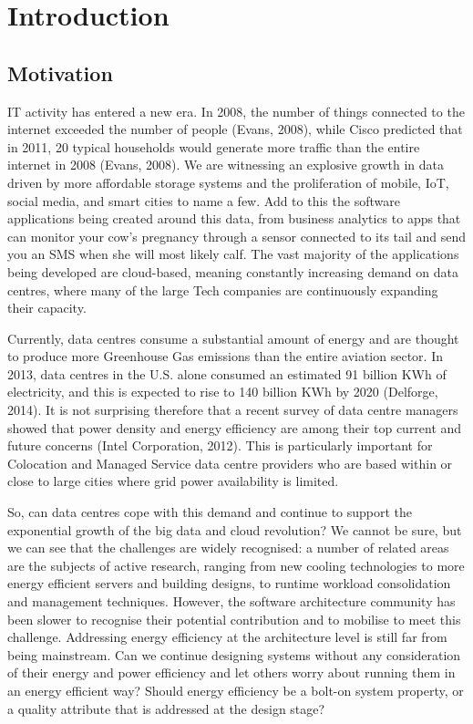 \chapter{Introduction}

\section{Motivation}

IT activity has entered a new era. In 2008, the number of things connected to the internet exceeded the number of people (Evans, 2008), while Cisco predicted that in 2011, 20 typical households would generate more traffic than the entire internet in 2008 (Evans, 2008). We are witnessing an explosive growth in data driven by more affordable storage systems and the proliferation of mobile, IoT, social media, and smart cities to name a few. Add to this the software applications being created around this data, from business analytics to apps that can monitor your cow’s pregnancy through a sensor connected to its tail and send you an SMS when she will most likely calf. The vast majority of the applications being developed are cloud-based, meaning constantly increasing demand on data centres, where many of the large Tech companies are continuously expanding their capacity. 

Currently, data centres consume a substantial amount of energy and are thought to produce more Greenhouse Gas emissions than the entire aviation sector. In 2013, data centres in the U.S. alone consumed an estimated 91 billion KWh of electricity, and this is expected to rise to 140 billion KWh by 2020  (Delforge, 2014). It is not surprising therefore that a recent survey of data centre managers showed that power density and energy efficiency are among their top current and future concerns (Intel Corporation, 2012). This is particularly important for Colocation and Managed Service data centre providers who are based within or close to large cities where grid power availability is limited. 

So, can data centres cope with this demand and continue to support the exponential growth of the big data and cloud revolution? We cannot be sure, but we can see that the challenges are widely recognised: a number of related areas are the subjects of active research, ranging from new cooling technologies to more energy efficient servers and building designs, to runtime workload consolidation and management techniques. However, the software architecture community has been slower to recognise their potential contribution and to mobilise to meet this challenge. Addressing energy efficiency at the architecture level is still far from being mainstream. Can we continue designing systems without any consideration of their energy and power efficiency and let others worry about running them in an energy efficient way? Should energy efficiency be a bolt-on system property, or a quality attribute that is addressed at the design stage?

